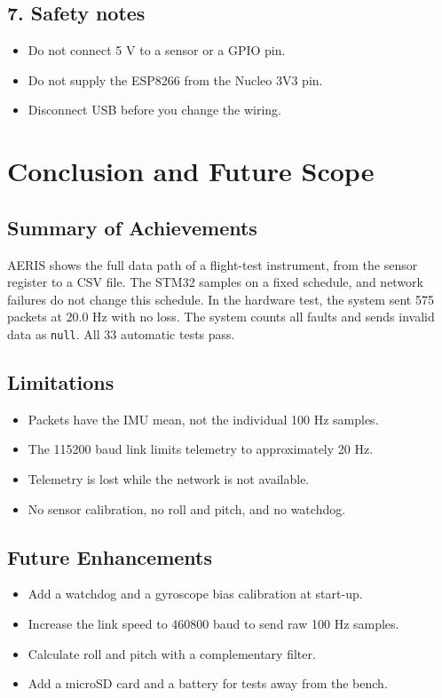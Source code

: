 \documentclass[12pt,a4paper]{report}
\begin{document}
\section*{7. Safety notes}
\begin{itemize}
\item Do not connect 5 V to a sensor or a GPIO pin.
\item Do not supply the ESP8266 from the Nucleo 3V3 pin.
\item Disconnect USB before you change the wiring.
\end{itemize}

\chapter{Conclusion and Future Scope}
\section{Summary of Achievements}
AERIS shows the full data path of a flight-test instrument, from the sensor register to a CSV file. The STM32 samples on a fixed schedule, and network failures do not change this schedule. In the hardware test, the system sent 575 packets at 20.0 Hz with no loss. The system counts all faults and sends invalid data as \texttt{null}. All 33 automatic tests pass.

\section{Limitations}
\begin{itemize}
\item Packets have the IMU mean, not the individual 100 Hz samples.
\item The 115200 baud link limits telemetry to approximately 20 Hz.
\item Telemetry is lost while the network is not available.
\item No sensor calibration, no roll and pitch, and no watchdog.
\end{itemize}

\section{Future Enhancements}
\begin{itemize}
\item Add a watchdog and a gyroscope bias calibration at start-up.
\item Increase the link speed to 460800 baud to send raw 100 Hz samples.
\item Calculate roll and pitch with a complementary filter.
\item Add a microSD card and a battery for tests away from the bench.
\end{itemize}
\end{document}
